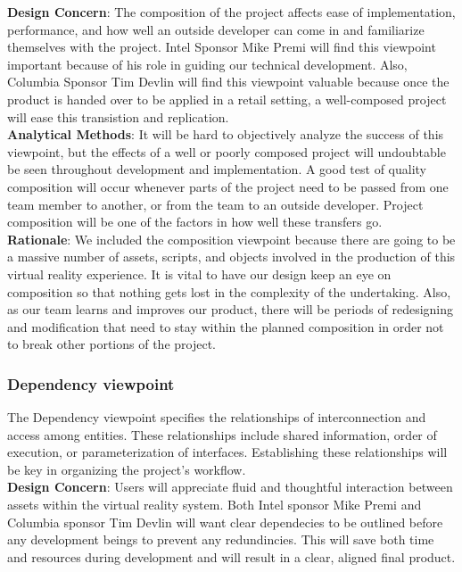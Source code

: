 \documentclass[10pt,journal,compsoc,onecolumn, draftclsnofoot]{IEEEtran}
\begin{document}
\hangindent=0.5cm \textbf{Design Concern}: The composition of the project affects ease of implementation, performance, and how well an outside developer can come in
and familiarize themselves with the project. Intel Sponsor Mike Premi will
find this viewpoint important because of his role in guiding our technical
development. Also, Columbia Sponsor Tim Devlin will find this viewpoint
valuable because once the product is handed over to be applied in a retail
setting, a well-composed project will ease this transistion and replication.\\

\hangindent=0.5cm \textbf{Analytical Methods}: It will be hard to objectively analyze the success of this viewpoint, but the effects of a well or poorly composed project will
undoubtable be seen throughout development and implementation. A good test of
quality composition will occur whenever parts of the project need to be
passed from one team member to another, or from the team to an outside
developer. Project composition will be one of the factors in how well these
transfers go.\\

\hangindent=0.5cm \textbf{Rationale}: We included the composition viewpoint because there are going to be a massive number of assets, scripts, and objects involved in the
production of this virtual reality experience. It is vital to have our design
keep an eye on composition so that nothing gets lost in the complexity of the
undertaking. Also, as our team learns and improves our product, there will be
periods of redesigning and modification that need to stay within the planned
composition in order not to break other portions of the project. \\

\subsubsection{Dependency viewpoint}
The Dependency viewpoint specifies the relationships of interconnection and access among entities. These relationships include shared information, order of execution, or parameterization of interfaces. Establishing these relationships will be key in organizing the project's workflow.\\

\hangindent=0.5cm \textbf{Design Concern}: Users will appreciate fluid and thoughtful interaction between assets within the virtual reality system. Both Intel sponsor Mike Premi and Columbia sponsor Tim Devlin will want clear dependecies to be outlined before any development beings to prevent any redundincies. This will save both time and resources during development and will result in a clear, aligned final product.\\
\end{document}
